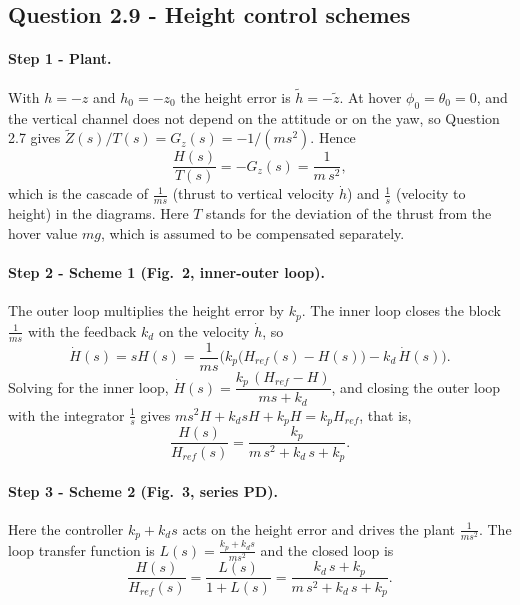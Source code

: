 \subsection*{Question 2.9 - Height control schemes}

\paragraph{Step 1 - Plant.}
With $h = -z$ and $h_0 = -z_0$ the height error is $\tilde h = -\tilde z$.
At hover $\phi_0 = \theta_0 = 0$, and the vertical channel does not depend on the attitude or on the yaw, so Question 2.7 gives $\tilde Z(s) / T(s) = G_z(s) = -1/(m s^2)$.
Hence
\begin{equation*}
\frac{H(s)}{T(s)} = -G_z(s) = \frac{1}{m\, s^2},
\end{equation*}
which is the cascade of $\frac{1}{ms}$ (thrust to vertical velocity $\dot h$) and $\frac{1}{s}$ (velocity to height) in the diagrams.
Here $T$ stands for the deviation of the thrust from the hover value $m g$, which is assumed to be compensated separately.

\paragraph{Step 2 - Scheme 1 (Fig.~2, inner-outer loop).}
The outer loop multiplies the height error by $k_p$.
The inner loop closes the block $\frac{1}{ms}$ with the feedback $k_d$ on the velocity $\dot h$, so
\begin{equation*}
\dot H(s) = s H(s) = \frac{1}{m s}\Big(k_p\big(H_{ref}(s) - H(s)\big) - k_d\, \dot H(s)\Big) .
\end{equation*}
Solving for the inner loop, $\dot H(s) = \dfrac{k_p\,(H_{ref} - H)}{m s + k_d}$, and closing the outer loop with the integrator $\frac{1}{s}$ gives $m s^2 H + k_d s H + k_p H = k_p H_{ref}$, that is,
\begin{equation*}
\frac{H(s)}{H_{ref}(s)} = \frac{k_p}{m\, s^2 + k_d\, s + k_p}.
\end{equation*}

\paragraph{Step 3 - Scheme 2 (Fig.~3, series PD).}
Here the controller $k_p + k_d s$ acts on the height error and drives the plant $\frac{1}{m s^2}$.
The loop transfer function is $L(s) = \frac{k_p + k_d s}{m s^2}$ and the closed loop is
\begin{equation*}
\frac{H(s)}{H_{ref}(s)} = \frac{L(s)}{1 + L(s)} = \frac{k_d\, s + k_p}{m\, s^2 + k_d\, s + k_p}.
\end{equation*}

